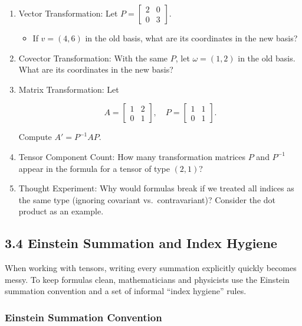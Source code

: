 \documentclass[
  letterpaper,
  DIV=11,
  numbers=noendperiod]{scrreprt}
\providecommand{\tightlist}{%
  \setlength{\itemsep}{0pt}\setlength{\parskip}{0pt}}
\begin{document}
\begin{enumerate}
\def\labelenumi{\arabic{enumi}.}
\item
  Vector Transformation: Let
  \(P = \begin{bmatrix}2 & 0 \\ 0 & 3\end{bmatrix}\).

  \begin{itemize}
  \tightlist
  \item
    If \(v = (4,6)\) in the old basis, what are its coordinates in the
    new basis?
  \end{itemize}
\item
  Covector Transformation: With the same \(P\), let \(\omega = (1,2)\)
  in the old basis. What are its coordinates in the new basis?
\item
  Matrix Transformation: Let

  \[
  A = \begin{bmatrix}1 & 2 \\ 0 & 1\end{bmatrix}, \quad
  P = \begin{bmatrix}1 & 1 \\ 0 & 1\end{bmatrix}.
  \]

  Compute \(A' = P^{-1} A P\).
\item
  Tensor Component Count: How many transformation matrices \(P\) and
  \(P^{-1}\) appear in the formula for a tensor of type \((2,1)\)?
\item
  Thought Experiment: Why would formulas break if we treated all indices
  as the same type (ignoring covariant vs.~contravariant)? Consider the
  dot product as an example.
\end{enumerate}

\subsection{3.4 Einstein Summation and Index
Hygiene}\label{einstein-summation-and-index-hygiene}

When working with tensors, writing every summation explicitly quickly
becomes messy. To keep formulas clean, mathematicians and physicists use
the Einstein summation convention and a set of informal ``index
hygiene'' rules.

\subsubsection{Einstein Summation
Convention}\label{einstein-summation-convention}
\end{document}
